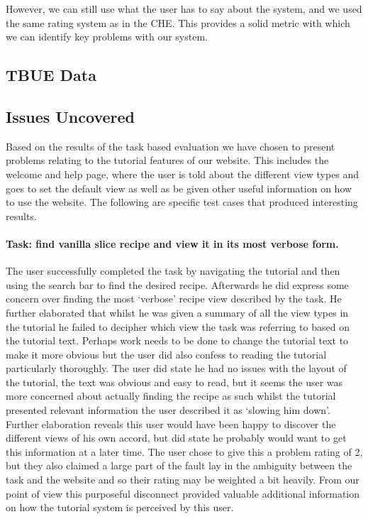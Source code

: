 However, we can still use what the user has to say about the system,
and we used the same rating system as in the CHE. This provides a
solid metric with which we can identify key problems with our system.

\subsection{TBUE Data}



\subsection{Issues Uncovered}

Based on the results of the task based evaluation we have chosen to
present problems relating to the tutorial features of our
website. This includes the welcome and help page, where the user is
told about the different view types and goes to set the default view
as well as be given other useful information on how to use the
website. The following are specific test cases that produced
interesting results.

\paragraph{Task: find vanilla slice recipe and view it in its most verbose form.}

The user successfully completed the task by navigating the tutorial
and then using the search bar to find the desired recipe. Afterwards
he did express some concern over finding the most ‘verbose’ recipe
view described by the task. He further elaborated that whilst he was
given a summary of all the view types in the tutorial he failed to
decipher which view the task was referring to based on the tutorial
text. Perhaps work needs to be done to change the tutorial text to
make it more obvious but the user did also confess to reading the
tutorial particularly thoroughly. The user did state he had no issues
with the layout of the tutorial, the text was obvious and easy to
read, but it seems the user was more concerned about actually finding
the recipe as such whilst the tutorial presented relevant information
the user described it as ‘slowing him down’. Further elaboration
reveals this user would have been happy to discover the different
views of his own accord, but did state he probably would want to get
this information at a later time. The user chose to give this a
problem rating of 2, but they also claimed a large part of the fault
lay in the ambiguity between the task and the website and so their
rating may be weighted a bit heavily. From our point of view this
purposeful disconnect provided valuable additional information on how
the tutorial system is perceived by this user.

